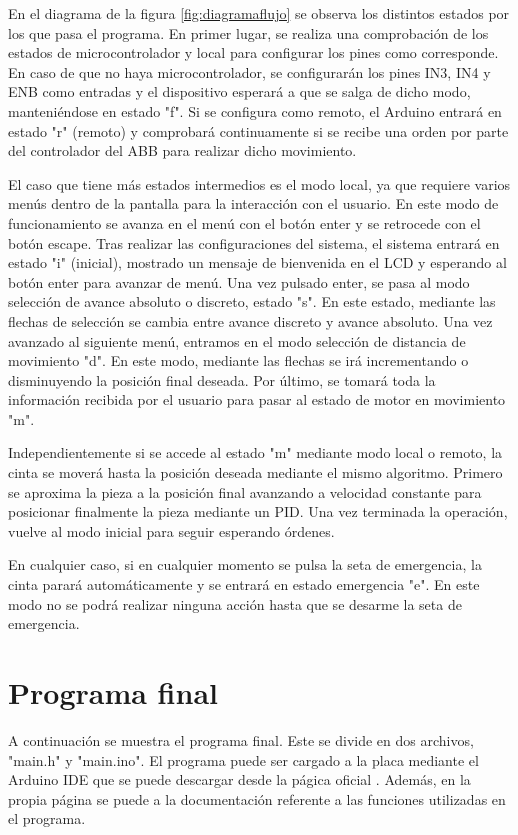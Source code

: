 En el diagrama de la figura \ref{fig:diagramaflujo} se observa los distintos estados por los que pasa el 
programa. En primer lugar, se realiza una comprobación de los estados de microcontrolador y local para 
configurar los pines como corresponde. En caso de que no haya microcontrolador, se configurarán los pines
IN3, IN4 y ENB como entradas y el dispositivo esperará a que se salga de dicho modo, manteniéndose en estado 
"f". Si se configura como remoto, el Arduino entrará en estado "r" (remoto) y comprobará continuamente si se
recibe una orden por parte del controlador del ABB para realizar dicho movimiento.

El caso que tiene más estados intermedios es el modo local, ya que requiere varios menús dentro de la pantalla
para la interacción con el usuario. En este modo de funcionamiento se avanza en el menú con el botón enter y se
retrocede con el botón escape. Tras realizar las configuraciones del sistema, el sistema entrará en estado 
"i" (inicial), mostrado un mensaje de bienvenida en el LCD y esperando al botón enter para avanzar de menú. Una 
vez pulsado enter, se pasa al modo selección de avance absoluto o discreto, estado "s". En este estado, mediante
las flechas de selección se cambia entre avance discreto y avance absoluto. Una vez avanzado al siguiente menú, 
entramos en el modo selección de distancia de movimiento "d". En este modo, mediante las flechas se irá incrementando
o disminuyendo la posición final deseada. Por último, se tomará toda la información recibida por el usuario para 
pasar al estado de motor en movimiento "m".

Independientemente si se accede al estado "m" mediante modo local o remoto, la cinta se moverá hasta la posición 
deseada mediante el mismo algoritmo. Primero se aproxima la pieza a la posición final avanzando a velocidad constante
para posicionar finalmente la pieza mediante un PID. Una vez terminada la operación, vuelve al modo inicial para 
seguir esperando órdenes.

En cualquier caso, si en cualquier momento se pulsa la seta de emergencia, la cinta parará automáticamente y se entrará
en estado emergencia "e". En este modo no se podrá realizar ninguna acción hasta que se desarme la seta de emergencia.

\section{Programa final}

A continuación se muestra el programa final. Este se divide en dos archivos, "main.h" y "main.ino". El programa puede ser 
cargado a la placa mediante el Arduino IDE que se puede descargar desde la págica oficial \cite{arduino}. Además, en la propia
página se puede a la documentación referente a las funciones utilizadas en el programa.

